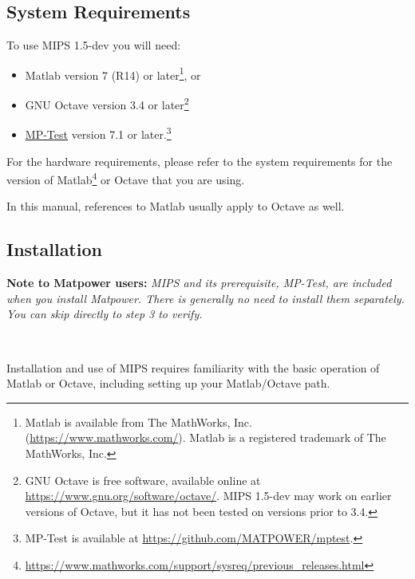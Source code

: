 \documentclass[12pt]{article}
\newcommand{\matlab}[0]{{\sc Matlab}}
\newcommand{\matpower}[0]{{\sc Matpower}}
\newcommand{\mptest}[0]{{MP-Test}}
\newcommand{\mptesturl}[0]{https://github.com/MATPOWER/mptest}
\newcommand{\mptestlink}[0]{\href{\mptesturl}{\mptest{}}}
\newcommand{\mips}[0]{{MIPS}}
\newcommand{\mipsver}[0]{1.5-dev}
\numberwithin{equation}{section}
\numberwithin{table}{section}
\numberwithin{figure}{section}
\begin{document}
\subsection{System Requirements}
\label{sec:sysreq}
To use \mips{} \mipsver{} you will need:
\begin{itemize}
\item \matlab{}\textsuperscript{\tiny \textregistered} version 7 (R14) or later\footnote{\matlab{} is available from The MathWorks, Inc. (\url{https://www.mathworks.com/}). \matlab{} is a registered trademark of The MathWorks, Inc.}, or
\item GNU Octave version 3.4 or later\footnote{GNU Octave \cite{octave} is free software, available online at \url{https://www.gnu.org/software/octave/}. \mips{} \mipsver{} may work on earlier versions of Octave, but it has not been tested on versions prior to 3.4.}
\item \mptestlink{} version 7.1 or later.\footnote{\mptest{} is available at \url{\mptesturl}.}
\end{itemize}

For the hardware requirements, please refer to the system requirements for the version of \matlab{}\footnote{\url{https://www.mathworks.com/support/sysreq/previous_releases.html}} or Octave that you are using.

In this manual, references to \matlab{} usually apply to Octave as well.

\subsection{Installation}
\label{sec:installation}

{\bf Note to \matpower{} users:} \emph{\mips{} and its prerequisite, \mptest{}, are included when you install \matpower{}. There is generally no need to install them separately. You can skip directly to step 3 to verify.}

~

Installation and use of \mips{} requires familiarity with the basic operation of \matlab{} or Octave, including setting up your \matlab{}/Octave path.
\end{document}
